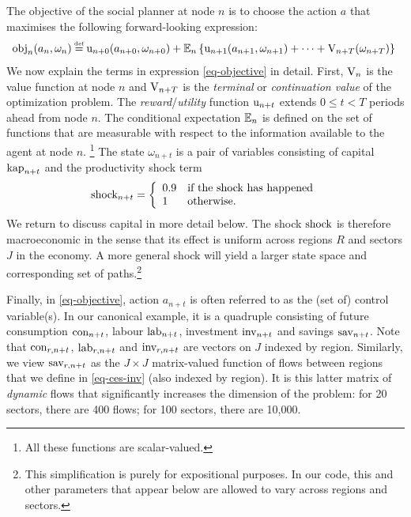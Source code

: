 \documentclass[12pt,a4paper,twoside, draft]{article}
\begin{document}
The objective of the social planner at node $n$ is to choose the action $a$
that maximises the following forward-looking expression:
\begin{align}\label{eq-objective}
\hskip-3pt   \textup{obj}_{n}(a_{n}, \omega_{n}) \defeq
   \textup{u}_{n + 0}(a_{n + 0}, \omega_{n + 0})
    + \mbb{E}_{n}\left\{
      \textup{u}_{n + 1}(a_{n + 1}, \omega_{n + 1}) + \cdots
      + \textup{V}_{n + T}(\omega_{n + T})
    \right\}
\end{align}
We now explain the terms in expression \eqref{eq-objective} in detail.
First, $\textup{V}_{n}$ is the value function at node $n$ and
$\textup{V}_{n + T}$ is the \emph{terminal} or \emph{continuation value} of the
optimization problem.
The \emph{reward}/\emph{utility} function $\textup{u}_{n + t}$ extends
$0 \leq t < T$ periods ahead from node $n$.
The conditional expectation $\mathbb{E}_{n}$ is defined on the set of functions
that are measurable with respect to the information available to the agent at 
node $n$.
\footnote{
   All these functions are scalar-valued.
}
The state $\omega_{n + t} $ is a pair of variables consisting  of capital
$\textup{kap}_{n + t}$ and the productivity shock term
\begin{equation}
   \textup{shock}_{n + t} = \left\{
      \begin{array}{ll}
         0.9 & \textup{if the shock has happened}\\
         1 & \textup{otherwise.}
      \end{array}\right.
\end{equation}
We return to discuss capital in more detail below.
The shock $\textup{shock}$ is therefore macroeconomic in the sense that
its effect is uniform across regions $R$ and sectors $J$ in the economy.
A more general shock will yield a larger state space and corresponding set of
paths.\footnote{
   This simplification is purely for expositional purposes.
   In our code, this and other parameters that appear below are allowed to vary 
   across regions and sectors.
}

Finally, in \eqref{eq-objective}, action $a_{n + t}$ is often referred to as
the (set of) control variable(s).
In our canonical example, it is a quadruple consisting of future consumption
$\textup{con}_{n + t}$, labour $\textup{lab}_{n + t}$, investment
$\textup{inv}_{n + t}$ and savings $\textup{sav}_{n + t}$.
Note that $\textup{con}_{r, n + t}$, $\textup{lab}_{r, n + t}$ and
$\textup{inv}_{r, n + t}$ are vectors on $J$ indexed by region.
Similarly, we view $\textup{sav}_{r, n + t}$ as the $J\times J$ matrix-valued
function of flows between regions that we define in \eqref{eq-ces-inv} (also
indexed by region).
It is this latter matrix of \emph{dynamic} flows that significantly increases
the dimension of the problem: for 20 sectors, there are 400 flows; for 100
sectors, there are 10,000.
\end{document}
